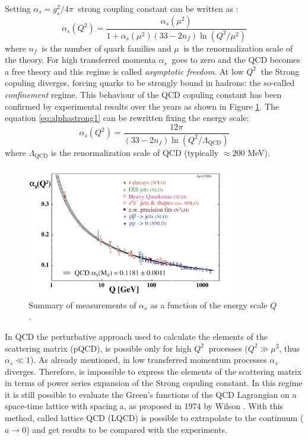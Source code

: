 Setting $\alpha_{s} = g^{2}_{s}/4\pi\ $ strong coupling constant can be written as \cite{pdg}:
\begin{equation} \label{eq:alphastrong1}
    \alpha_{s}(Q^{2}) = \frac{\alpha_{s}(\mu^{2})}{1 + \alpha_{s}(\mu^{2})(33 - 2 n_{f})
    \ln(Q^{2}/\mu^{2})}
\end{equation}
where $n_{f}\ $ is the number of quark families and $\mu\ $ is the renormalization scale of 
the theory.
For high transferred momenta $\alpha_{s}\ $ goes to zero and the QCD becomes a free theory and 
this regime is called \textit{asymptotic freedom}. At low $Q^{2}\ $ the Strong copuling diverges,
forcing quarks to be strongly bound in hadrons: the so-called \textit{confinement} regime. 
This behaviour of the QCD copuling constant has been confirmed by experimental results over the
years as shown in Figure \ref{fig:alpharun}.
The equation \ref{eq:alphastrong1} can be rewritten fixing the energy scale:
\begin{equation} \label{eq:alphastrong2}
    \alpha_{s}(Q^{2}) = \frac{12 \pi}{(33 - 2 n_{f})\ln(Q^{2}/\Lambda_{\mathrm{QCD}})}
\end{equation}
where $\Lambda_{\mathrm{QCD}}$ is the renormalization scale of QCD (typically $\approx 200$ MeV).

\begin{figure}[]
    \captionsetup{justification=centering}
    \centering
    \includegraphics[width=0.8\textwidth]{gfx/alpharun}
	\caption{Summary of measurements of $\alpha_{s}$ as a function of the energy scale $Q$ \cite{pdg}.}
	\label{fig:alpharun}
\end{figure}

In QCD the perturbative approach used to calculate the elements of the scattering matrix (pQCD), is 
possible only for high $Q^{2}\ $ processes ($Q^{2} \gg \mu^{2}$, thus $\alpha_{s} \ll 1$).
As already mentioned, in low transferred momentum processes $\alpha_{s}$ diverges. 
Therefore, is impossible to express the elements of the scattering matrix in terms of power series
expansion of the Strong copuling constant.
In this regime it is still possible to evaluate the Green’s functions of the QCD Lagrangian
on a space-time lattice with spacing a, as proposed in 1974 by Wilson \cite{lattice}.
With this method, called lattice QCD (LQCD) is possible to extrapolate to the continuum 
($a \rightarrow 0$) and get results to be compared with the experiments.

